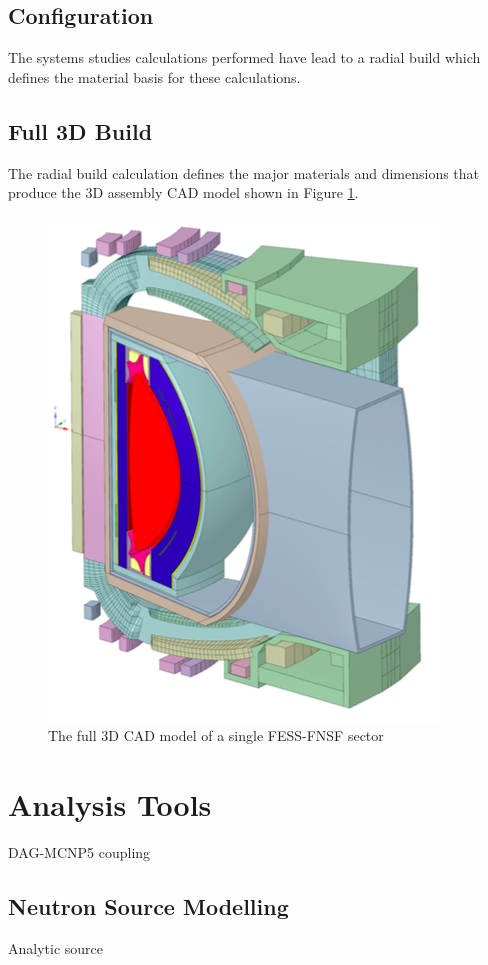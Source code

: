 \documentclass[12pt, letterpaper]{elsarticle}
\begin{document}
\subsection{Configuration}
The systems studies calculations performed have lead to a radial build which defines the material basis for these calculations.
\subsection{Full 3D Build}
The radial build calculation defines the major materials and dimensions that produce the 3D assembly CAD model shown in Figure \ref{fig:cad_fess_fnsf_3d}.
\begin{figure}[h!]
  \centering
  \includegraphics[scale=0.4]{../plots/fess_fnsf_3d_cad.png}
  \caption{The full 3D CAD model of a single FESS-FNSF sector}
  \label{fig:cad_fess_fnsf_3d}
\end{figure}

\section{Analysis Tools}
DAG-MCNP5 coupling
\subsection{Neutron Source Modelling}
Analytic source
\end{document}
